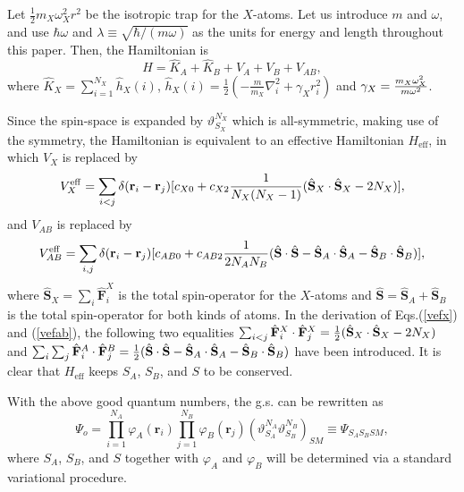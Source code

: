 \documentclass[10pt]{wlscirep}
\begin{document}
Let $\frac{1}{2}m_X\omega_X^2 r^2$ be the isotropic trap for the $X$-atoms.
Let us introduce $m$ and $\omega$, and use $\hbar\omega$ and $\lambda\equiv%
\sqrt{\hbar/(m\omega)}$ as the units for energy and length throughout this
paper. Then, the Hamiltonian is
\begin{equation}
\hat{H} = \hat{K}_A+\hat{K}_B+V_A+V_B+V_{AB},  \label{h}
\end{equation}
where $\hat{K}_X=\sum_{i=1}^{N_X}\hat{h}_X(i)$, $\hat{h}_X(i)=\frac{1}{2}(-%
\frac{m}{m_X}\nabla_i^2+\gamma_X r_i^2)$ and $\gamma_X=\frac{m_X\omega_X^2}{%
m\omega^2}$.

Since the spin-space is expanded by $\vartheta _{S_{X}}^{N_{X}}$ which is
all-symmetric, making use of the symmetry, the Hamiltonian is equivalent to
an effective Hamiltonian $H_{\mathrm{eff}}$, in which $V_{X}$ is replaced by
\begin{equation}
V_{X}^{\mathrm{eff}}=\sum_{i<j}\delta (\mathbf{r}_{i}-\mathbf{r}%
_{j})[c_{X0}+c_{X2}\frac{1}{N_{X}(N_{X}-1)}(\hat{\mathbf{S}}_{X}\cdot \hat{%
\mathbf{S}}_{X}-2N_{X})],  \label{vefx}
\end{equation}%
and $V_{AB}$ is replaced by
\begin{equation}
V_{AB}^{\mathrm{eff}}=\sum_{i,j}\delta (\mathbf{r}_{i}-\mathbf{r}%
_{j})[c_{AB0}+c_{AB2}\frac{1}{2N_{A}N_{B}}(\hat{\mathbf{S}}\cdot \hat{%
\mathbf{S}}-\hat{\mathbf{S}}_{A}\cdot \hat{\mathbf{S}}_{A}-\hat{\mathbf{S}}%
_{B}\cdot \hat{\mathbf{S}}_{B})],  \label{vefab}
\end{equation}%
where $\hat{\mathbf{S}}_{X}=\sum_{i}\hat{\mathbf{F}}_{i}^{X}$ is the total
spin-operator for the $X$-atoms and $\hat{\mathbf{S}}=\hat{\mathbf{S}}_{A}+%
\hat{\mathbf{S}}_{B}$ is the total spin-operator for both kinds of atoms. In
the derivation of Eqs.(\ref{vefx}) and (\ref{vefab}),
the following two equalities $\sum_{i<j}\hat{\mathbf{F}}_{i}^{X}\cdot \hat{%
\mathbf{F}}_{j}^{X}=\frac{1}{2}(\hat{\mathbf{S}}_{X}\cdot \hat{\mathbf{S}}%
_{X}-2N_{X})$ and $\sum_{i}\sum_{j}\hat{\mathbf{F}}_{i}^{A}\cdot \hat{%
\mathbf{F}}_{j}^{B}=\frac{1}{2}(\hat{\mathbf{S}}\cdot \hat{\mathbf{S}}-\hat{%
\mathbf{S}}_{A}\cdot \hat{\mathbf{S}}_{A}-\hat{\mathbf{S}}_{B}\cdot \hat{%
\mathbf{S}}_{B})$ have been introduced. It is clear that $H_{\mathrm{eff}}$
keeps $S_{A}$, $S_{B}$, and $S$ to be conserved.

With the above good quantum numbers, the g.s. can be rewritten as
\begin{equation}
\Psi_o = \prod_{i=1}^{N_A} \varphi_A(\mathbf{r}_i) \prod_{j=1}^{N_B}
\varphi_B(\mathbf{r}_j) (\vartheta_{S_A}^{N_A}\vartheta_{S_B}^{N_B})_{SM}
\equiv \Psi_{S_AS_BSM},  \label{gs}
\end{equation}
where $S_A$, $S_B$, and $S$ together with $\varphi_A$ and $\varphi_B$ will
be determined via a standard variational procedure.
\end{document}
